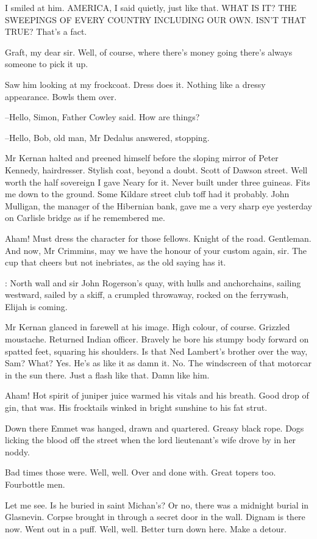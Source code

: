 I smiled at him.
AMERICA,
I said quietly,
just like that.
WHAT IS IT?
THE
SWEEPINGS OF EVERY COUNTRY INCLUDING OUR OWN.
ISN'T THAT TRUE?
That's a
fact.

Graft,
my dear sir.
Well, of course, where there's money going
there's
always someone to pick it up.

Saw him looking at my frockcoat.
Dress does it.
Nothing like a dressy
appearance.
Bowls them over.

--Hello, Simon,
Father Cowley said.
How are things?

--Hello, Bob, old man,
Mr Dedalus answered,
stopping.

Mr Kernan halted and preened himself
before the sloping mirror of Peter
Kennedy, hairdresser.
Stylish coat, beyond a doubt.
Scott of Dawson
street.
Well worth the half sovereign I gave Neary for it.
Never built
under three guineas.
Fits me down to the ground.
Some Kildare street club
toff had it probably.
John Mulligan, the manager of the Hibernian bank,
gave me a very sharp eye yesterday
on Carlisle bridge as if he remembered
me.

Aham!
Must dress the character for those fellows.
Knight of the road.
Gentleman.
And now, Mr Crimmins,
may we have the honour of your custom again, sir.
The cup that cheers but not inebriates,
as the old saying has it.

:
North wall and sir John Rogerson's quay,
with hulls and anchorchains,
sailing westward,
sailed by a skiff,
a crumpled throwaway,
rocked on the
ferrywash,
Elijah is coming.

Mr Kernan glanced in farewell at his image.
High colour, of course.
Grizzled moustache.
Returned Indian officer.
Bravely he bore his stumpy body forward on spatted feet,
squaring his shoulders.
Is that Ned Lambert's brother over the way, Sam?
What?
Yes.
He's as like it as damn it.
No.
The windscreen of that motorcar in the sun there.
Just a flash like that.
Damn like him.%

Aham!
Hot spirit of juniper juice warmed his vitals and his breath.
Good
drop of gin, that was.
His frocktails winked in bright sunshine to his
fat strut.

Down there
Emmet was hanged, drawn and quartered.
Greasy black rope.
Dogs
licking the blood off the street
when the lord lieutenant's wife drove by
in her noddy.

Bad times those were.
Well, well.
Over and done with.
Great topers too.
Fourbottle men.

Let me see.
Is he buried in saint Michan's?
Or no, there was a midnight burial in Glasnevin.
Corpse brought in through a secret door in the wall.
Dignam is there now.
Went out in a puff.
Well, well.
Better turn down here.
Make a detour.

